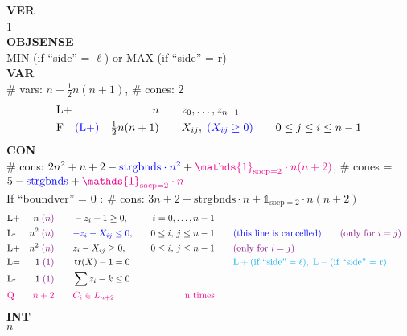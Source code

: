 \documentclass[11pt,a4paper]{article}
\newcommand{\ones}{\mathds{1}}
\DeclareMathOperator{\tr}{tr}
\theoremstyle{definition}
\begin{document}
{\footnotesize
\noindent
\textbf{VER} \\
1 \\
\textbf{OBJSENSE} \\
MIN (if ``side'' = $\ell$) \; or \; MAX (if ``side'' = r) \\
\textbf{VAR} \\
\# vars:  $n+\tfrac{1}{2}n(n+1)$, \qquad \# cones: $2$ \\
\[
  \begin{aligned}
    &\text{L+} &n \qquad & z_0,\dots,z_{n-1} \\
    &\text{F}\quad{\color{blue} (\text{L}+)}  &\tfrac{1}{2}n(n+1) \qquad & X_{ij},\;
    {\color{blue} (X_{ij} \geq 0)} \qquad 0 \leq j \leq i \leq n-1
  \end{aligned}
\]
\textbf{CON} \\
\# cons: $2n^2+n+2 - {\color{blue}\text{strgbnds}\cdot n^2} +
{\color{magenta} \ones_{\text{socp} = 2} \cdot n(n+2)}$, \qquad
\# cones = $5 - {\color{blue} \text{strgbnds}} + {\color{magenta}
  \ones_{\text{socp} = 2} \cdot n}$ \\
{\color{violet} If ``boundver'' = 0 : \# cons: $3n+2 - \text{strgbnds}\cdot
  n + \ones_{\text{socp} = 2} \cdot n(n+2)$} \\
\[
  \begin{aligned}
    &\text{L+} &n\; {\color{violet}(n)} \qquad & -z_i + 1 \geq 0, \quad & i = 0,\dots,n-1 \\
    &\text{L-} &n^2\; {\color{violet}(n)} \qquad & {\color{blue}-z_i - X_{ij} \leq 0},\quad & 0
    \leq i,\, j \leq n-1 &\qquad {\color{blue} \text{(this line is
        cancelled)}} \qquad {\color{violet} (\text{only for } i = j)}\\
    &\text{L+} &n^2\; {\color{violet}(n)} \qquad & z_i - X_{ij} \geq 0,\quad & 0
    \leq i, \, j \leq n-1 &\qquad {\color{violet} (\text{only for } i = j)}\\
    &\text{L=}  &1\; {\color{violet}(1)} \qquad & \tr(X) - 1 = 0 \quad & \qquad & \qquad
    {\color{cyan} \text{L}+ (\text{if ``side''} = \ell),\; \text{L}-
      (\text{if ``side'' = r})} \\
    &\text{L-}  &1\; {\color{violet}(1)} \qquad & \sum z_i - k \leq 0 \\
    &{\color{magenta} \text{Q}} & {\color{magenta} n+2} \qquad &
    {\color{magenta} C_i \in L_{n+2}} \qquad &
    {\color{magenta} \text{n times}}
  \end{aligned}
\]
\textbf{INT} \\
$n$ \\
}
\end{document}
